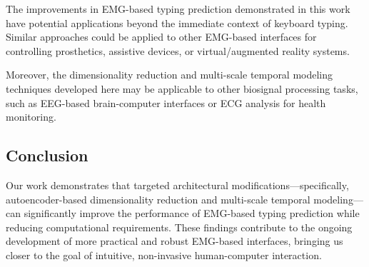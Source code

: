 The improvements in EMG-based typing prediction demonstrated in this work have potential applications beyond the immediate context of keyboard typing. Similar approaches could be applied to other EMG-based interfaces for controlling prosthetics, assistive devices, or virtual/augmented reality systems.

Moreover, the dimensionality reduction and multi-scale temporal modeling techniques developed here may be applicable to other biosignal processing tasks, such as EEG-based brain-computer interfaces or ECG analysis for health monitoring.

\subsection{Conclusion}

Our work demonstrates that targeted architectural modifications—specifically, autoencoder-based dimensionality reduction and multi-scale temporal modeling—can significantly improve the performance of EMG-based typing prediction while reducing computational requirements. These findings contribute to the ongoing development of more practical and robust EMG-based interfaces, bringing us closer to the goal of intuitive, non-invasive human-computer interaction. 